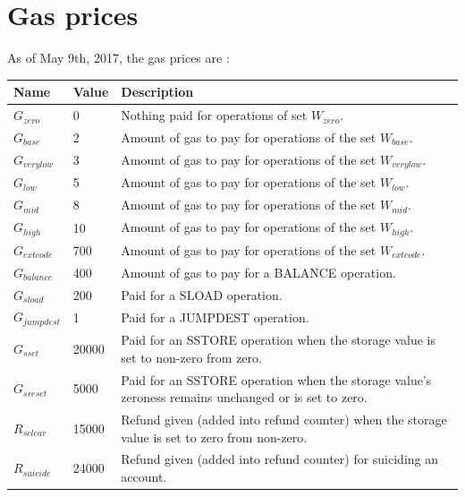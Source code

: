 \documentclass{article}
\begin{document}
	\clearpage


	\appendix

	\section{Gas prices}
		\label{app:gas-prices}

		As of May 9th, 2017, the gas prices are \cite{yellow-paper}: 
		\begin{table}[!ht]
		\footnotesize
		\noindent \begin{tabular}{| l | l | p{8cm} |}
			\hline
			Name 				& Value 	& Description \\ \hline
			$G_{zero}$ 			& 0 		& Nothing paid for operations of set $W_{zero}$. \\ \hline
			$G_{base}$ 			& 2 		& Amount of gas to pay for operations of the set $W_{base}$. \\ \hline
			$G_{verylow}$ 		& 3 		& Amount of gas to pay for operations of the set $W_{verylow}$. \\ \hline
			$G_{low}$ 			& 5 		& Amount of gas to pay for operations of the set $W_{low}$. \\ \hline
			$G_{mid}$ 			& 8 		& Amount of gas to pay for operations of the set $W_{mid}$. \\ \hline
			$G_{high}$ 			& 10 		& Amount of gas to pay for operations of the set $W_{high}$. \\ \hline
			$G_{extcode}$ 		& 700 		& Amount of gas to pay for operations of the set $W_{extcode}$. \\ \hline
			$G_{balance}$ 		& 400 		& Amount of gas to pay for a BALANCE operation. \\ \hline
			$G_{sload}$ 		& 200 		& Paid for a SLOAD operation. \\ \hline
			$G_{jumpdest}$ 		& 1 		& Paid for a JUMPDEST operation. \\ \hline
			$G_{sset}$ 			& 20000 	& Paid for an SSTORE operation when the storage value is set to non-zero from zero. \\ \hline
			$G_{sreset}$ 		& 5000 		& Paid for an SSTORE operation when the storage value's zeroness remains unchanged or is set to zero. \\ \hline
			$R_{sclear}$ 		& 15000		& Refund given (added into refund counter) when the storage value is set to zero from non-zero. \\ \hline
			$R_{suicide}$ 		& 24000 	& Refund given (added into refund counter) for suiciding an account. \\ \hline

\end{tabular}
\end{table}
\end{document}
